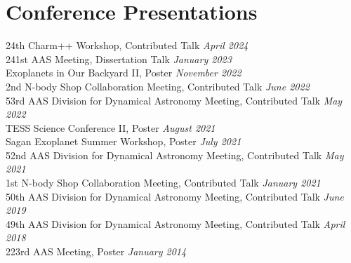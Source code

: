 \documentclass[letterpaper,11pt]{article}
\newcommand{\ConferenceEntry}[2]{#1 \hfill {\em #2}}
\newcommand{\resumeSubHeadingListStart}{\begin{itemize}[leftmargin=0.15in, label={}]}
\newcommand{\resumeSubHeadingListEnd}{\end{itemize}}
\begin{document}
\section{Conference Presentations}
  \resumeSubHeadingListStart
    \small{\item{
    
 \ConferenceEntry{24th Charm++ Workshop, Contributed Talk}{April 2024}\\
 \ConferenceEntry{241st AAS Meeting, Dissertation Talk}{January 2023} \\ 
 \ConferenceEntry{Exoplanets in Our Backyard II, Poster}{November 2022} \\ 
 \ConferenceEntry{2nd N-body Shop Collaboration Meeting, Contributed Talk}{June 2022} \\
 \ConferenceEntry{53rd AAS Division for Dynamical Astronomy Meeting, Contributed Talk}{May 2022} \\ 
 \ConferenceEntry{TESS Science Conference II, Poster}{August 2021} \\ 
 \ConferenceEntry{Sagan Exoplanet Summer Workshop, Poster}{July 2021} \\ 
 \ConferenceEntry{52nd AAS Division for Dynamical Astronomy Meeting, Contributed Talk}{May 2021} \\ 
 \ConferenceEntry{1st N-body Shop Collaboration Meeting, Contributed Talk}{January 2021} \\ 
 \ConferenceEntry{50th AAS Division for Dynamical Astronomy Meeting, Contributed Talk}{June 2019} \\ 
  \ConferenceEntry{49th AAS Division for Dynamical Astronomy Meeting, Contributed Talk}{April 2018} \\ 
  \ConferenceEntry{223rd AAS Meeting, Poster}{January 2014} \\ 
 
 \vspace{6pt}

 }}     
  \resumeSubHeadingListEnd
  
\end{document}
